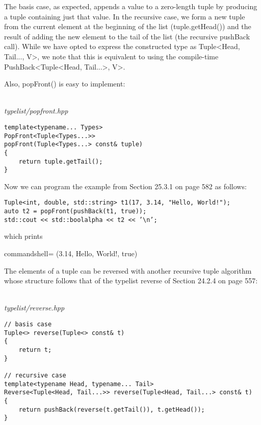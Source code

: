 The basis case, as expected, appends a value to a zero-length tuple by producing a tuple containing just that value. In the recursive case, we form a new tuple from the current element at the beginning of the list (tuple.getHead()) and the result of adding the new element to the tail of the list (the recursive pushBack call). While we have opted to express the constructed type as Tuple<Head, Tail..., V>, we note that this is equivalent to using the compile-time PushBack<Tuple<Head, Tail...>, V>.

Also, popFront() is easy to implement:

\hspace*{\fill} \\ %
\noindent
\textit{typelist/popfront.hpp}
\begin{lstlisting}[style=styleCXX]
template<typename... Types>
PopFront<Tuple<Types...>>
popFront(Tuple<Types...> const& tuple)
{
	return tuple.getTail();
}
\end{lstlisting}

Now we can program the example from Section 25.3.1 on page 582 as follows:

\begin{lstlisting}[style=styleCXX]
Tuple<int, double, std::string> t1(17, 3.14, "Hello, World!");
auto t2 = popFront(pushBack(t1, true));
std::cout << std::boolalpha << t2 << ’\n’;
\end{lstlisting}

which prints

\begin{tcblisting}{commandshell={}}
(3.14, Hello, World!, true)
\end{tcblisting}


The elements of a tuple can be reversed with another recursive tuple algorithm whose structure follows that of the typelist reverse of Section 24.2.4 on page 557:

\hspace*{\fill} \\ %
\noindent
\textit{typelist/reverse.hpp}
\begin{lstlisting}[style=styleCXX]
// basis case
Tuple<> reverse(Tuple<> const& t)
{
	return t;
}

// recursive case
template<typename Head, typename... Tail>
Reverse<Tuple<Head, Tail...>> reverse(Tuple<Head, Tail...> const& t)
{
	return pushBack(reverse(t.getTail()), t.getHead());
}
\end{lstlisting}

